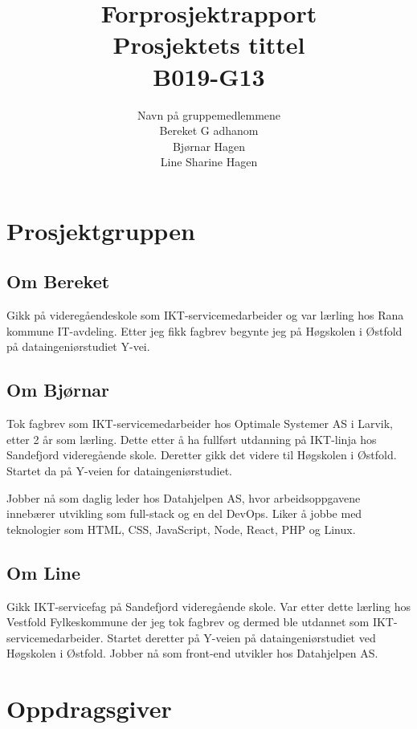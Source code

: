 \documentclass[11pt,a4paper]{report}
\begin{document}
\title{
Forprosjektrapport \\
\vspace{2cm}
Prosjektets tittel \\
B019-G13
}
\author{
\LARGE 
Navn på gruppemedlemmene \\
Bereket G adhanom \\
Bjørnar Hagen \\
Line Sharine Hagen
}
\maketitle

\section*{Prosjektgruppen}

\subsection*{Om Bereket}
Gikk på videregåendeskole som IKT-servicemedarbeider og var lærling hos Rana kommune IT-avdeling. Etter jeg fikk fagbrev begynte jeg på Høgskolen i Østfold på dataingeniørstudiet Y-vei.

\subsection*{Om Bjørnar}
Tok fagbrev som IKT-servicemedarbeider hos Optimale Systemer AS i Larvik, etter 2 år som lærling. Dette etter å ha fullført utdanning på IKT-linja hos Sandefjord videregående skole. Deretter gikk det videre til Høgskolen i Østfold. Startet da på Y-veien for dataingeniørstudiet.

Jobber nå som daglig leder hos Datahjelpen AS, hvor arbeidsoppgavene innebærer utvikling som full-stack og en del DevOps. Liker å jobbe med teknologier som HTML, CSS, JavaScript, Node, React, PHP og Linux.

\subsection*{Om Line}
Gikk IKT-servicefag på Sandefjord videregående skole. Var etter dette lærling hos Vestfold Fylkeskommune der jeg tok fagbrev og dermed ble utdannet som IKT-servicemedarbeider. Startet deretter på Y-veien på dataingeniørstudiet ved Høgskolen i Østfold. Jobber nå som front-end utvikler hos Datahjelpen AS. 

\section*{Oppdragsgiver}
\end{document}
